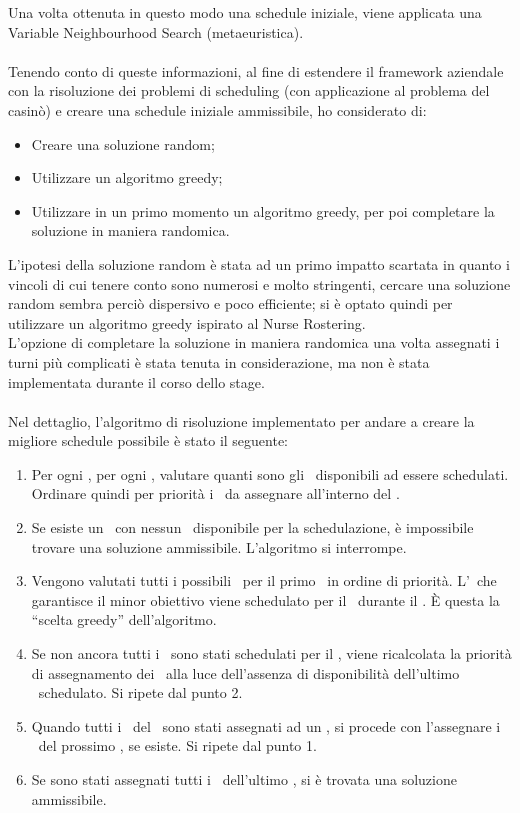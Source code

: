 Una volta ottenuta in questo modo una schedule iniziale, viene applicata una Variable Neighbourhood Search (metaeuristica).
\\ \\
Tenendo conto di queste informazioni, al fine di estendere il framework aziendale con la risoluzione dei problemi di scheduling (con applicazione al problema del casinò) e creare una schedule iniziale ammissibile, ho considerato di:
\begin{itemize}
\item Creare una soluzione random;
\item Utilizzare un algoritmo greedy;
\item Utilizzare in un primo momento un algoritmo greedy, per poi completare la soluzione in maniera randomica.
\end{itemize}
\noindent
L’ipotesi della soluzione random è stata ad un primo impatto scartata in quanto i vincoli di cui tenere conto sono numerosi e molto stringenti, cercare una soluzione random sembra perciò dispersivo e poco efficiente; si è optato quindi per utilizzare un algoritmo greedy ispirato al Nurse Rostering. \\
L’opzione di completare la soluzione in maniera randomica una volta assegnati i turni più complicati è stata tenuta in considerazione, ma non è stata implementata durante il corso dello stage.
\\ \\
Nel dettaglio, l'algoritmo di risoluzione implementato per andare a creare la migliore schedule possibile è stato il seguente:
\begin{enumerate}
\item Per ogni \ttb, per ogni \task, valutare quanti sono gli \items\ disponibili ad essere schedulati. Ordinare quindi per priorità i \task\ da assegnare all'interno del \ttb.
\item Se esiste un \task\ con nessun \items\ disponibile per la schedulazione, è impossibile trovare una soluzione ammissibile. L'algoritmo si interrompe.
\item Vengono valutati tutti i possibili \items\ per il primo \task\ in ordine di priorità. L'\items\ che garantisce il minor obiettivo viene schedulato per il \task\ durante il \ttb. È questa la ``scelta greedy'' dell'algoritmo.
\item Se non ancora tutti i \task\ sono stati schedulati per il \ttb, viene ricalcolata la priorità di assegnamento dei \task\ alla luce dell'assenza di disponibilità dell'ultimo \items\ schedulato. Si ripete dal punto 2.
\item Quando tutti i \task\ del \ttb\ sono stati assegnati ad un \items, si procede con l'assegnare i \task\ del prossimo \ttb, se esiste. Si ripete dal punto 1.
\item Se sono stati assegnati tutti i \task\ dell'ultimo \ttb, si è trovata una soluzione ammissibile.
\end{enumerate}

